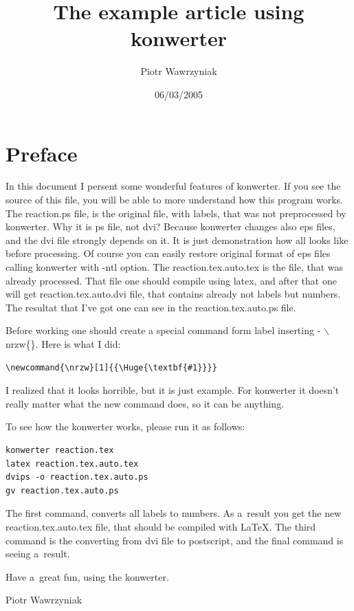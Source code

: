 \documentclass[a4paper,12pt,final]{article}
\date{06/03/2005}
\title{The example article using konwerter}
\author{Piotr Wawrzyniak}
\newcommand{\nrzw}[1]{{\Huge{\textbf{#1}}}}
\begin{document}
\maketitle
\section{Preface}
In this document I persent some wonderful features of konwerter. If you see the source of this file, you will be able to more understand how this program works. The reaction.ps file, is the original file, with labels, that was not preprocessed by konwerter. Why it is ps file, not dvi? Because konwerter changes also eps files, and the dvi file strongly depends on it. It is just demonstration how all looks like before processing. Of course you can easily restore original format of eps files calling konwerter with -ntl option. The reaction.tex.auto.tex is the file, that was already processed. That file one should compile using latex, and after that one will get reaction.tex.auto.dvi file, that contains already not labels but numbers. The resultat that I've got one can see in the reaction.tex.auto.ps file. 

Before working one should create a special command form label inserting - $\backslash$nrzw\{\}. Here is what I did:
\begin{verbatim}
\newcommand{\nrzw}[1]{{\Huge{\textbf{#1}}}}
\end{verbatim}

I realized that it looks horrible, but it is just example. For konwerter it doesn't really matter what the new command does, so it can be anything.

To see how the konwerter works, please run it as follows:
\begin{verbatim}
konwerter reaction.tex 
latex reaction.tex.auto.tex
dvips -o reaction.tex.auto.ps
gv reaction.tex.auto.ps 
\end{verbatim}

The first command, converts all labels to numbers. As a~result you get the new reaction.tex.auto.tex file, that should be compiled with \LaTeX. The third command is the converting from dvi file to postscript, and the final command is seeing a~result.

Have a~great fun, using the konwerter.
\begin{flushright}
  Piotr Wawrzyniak
\end{flushright}

\newpage
\end{document}
